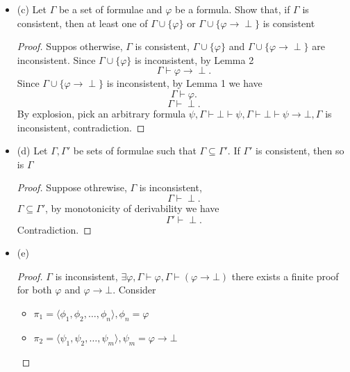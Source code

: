 \documentclass{article}
\begin{document}
\begin{itemize}
\begin{proof}
\begin{enumerate}
            \item $\Gamma \vdash (\varphi \rightarrow \psi) \rightarrow (\varphi \rightarrow \perp)$ (MP 2, 3)
            \item $\Gamma \vdash \varphi \rightarrow \perp$ (MP 1, 4)
        \end{enumerate}
    \end{proof}
    \item (c) Let $\Gamma$ be a set of formulae and $\varphi$ be a formula. Show that, if $\Gamma$ is consistent, then at least one of $\Gamma \cup \{\varphi\}$ or $\Gamma \cup \{\varphi \rightarrow \perp\}$ is consistent
    \begin{proof}
        Suppos otherwise, $\Gamma$ is consistent, $\Gamma \cup \{\varphi\}$ and $\Gamma \cup \{\varphi \rightarrow \perp\}$ are inconsistent.
        Since $\Gamma \cup \{\varphi\}$ is inconsistent, by Lemma 2
        \[
        \Gamma \vdash \varphi \rightarrow \perp.
        \]
        Since $\Gamma \cup \{\varphi \rightarrow \perp\}$ is inconsistent, by Lemma 1 we have
        \[
        \Gamma \vdash \varphi.
        \]
        \[
        \Gamma \vdash \perp.
        \]
        By explosion, pick an arbitrary formula $\psi, 
        \Gamma \vdash \bot \vdash \psi, \Gamma \vdash \bot \vdash \psi \rightarrow \bot, \Gamma$ is inconsistent, contradiction.
        \end{proof}
    \item (d) Let $\Gamma, \Gamma'$ be sets of formulae such that $\Gamma \subseteq \Gamma'$. If $\Gamma'$ is consistent, then so is $\Gamma$
    \begin{proof}
        Suppose othrewise, $\Gamma$ is inconsistent,
        \[
        \Gamma \vdash \perp.
        \]
        $\Gamma \subseteq \Gamma'$, by monotonicity of derivability we have
        \[
        \Gamma' \vdash \perp.
        \]
        Contradiction.
        \end{proof}
    \item (e)
    \begin{proof}
        $\Gamma $ is inconsistent, $\exists \varphi,  \Gamma \vdash \varphi, \Gamma \vdash (\varphi \rightarrow \bot)$
        there exists a finite proof for both $\varphi$ and $\varphi \rightarrow \bot$. Consider 
        \begin{itemize}
            \item $\pi_1 = \langle\phi_1, \phi_2, \dots, \phi_n\rangle, \phi_n = \varphi$
            \item $\pi_2 = \langle\psi_1, \psi_2, \dots, \psi_m\rangle, \psi_m = \varphi \rightarrow \bot$

\end{itemize}
\end{proof}
\end{itemize}
\end{document}
